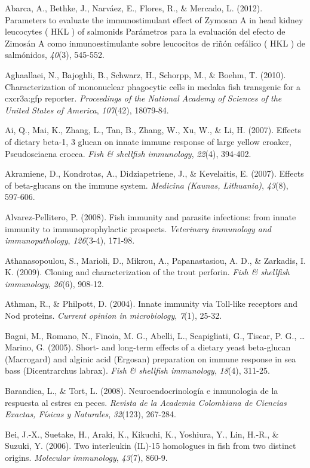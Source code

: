 \documentclass[12pt,letterpaper,oneside]{scrbook}
\begin{document}
Abarca, A., Bethke, J., Narváez, E., Flores, R., \& Mercado, L. (2012).
Parameters to evaluate the immunostimulant effect of Zymosan A in head
kidney leucocytes ( HKL ) of salmonids Parámetros para la evaluación del
efecto de Zimosán A como inmunoestimulante sobre leucocitos de riñón
cefálico ( HKL ) de salmónidos, \emph{40}(3), 545-552.

Aghaallaei, N., Bajoghli, B., Schwarz, H., Schorpp, M., \& Boehm, T.
(2010). Characterization of mononuclear phagocytic cells in medaka fish
transgenic for a cxcr3a:gfp reporter. \emph{Proceedings of the National
Academy of Sciences of the United States of America}, \emph{107}(42),
18079-84.

Ai, Q., Mai, K., Zhang, L., Tan, B., Zhang, W., Xu, W., \& Li, H.
(2007). Effects of dietary beta-1, 3 glucan on innate immune response of
large yellow croaker, Pseudosciaena crocea. \emph{Fish \& shellfish
immunology}, \emph{22}(4), 394-402.

Akramiene, D., Kondrotas, A., Didziapetriene, J., \& Kevelaitis, E.
(2007). Effects of beta-glucans on the immune system. \emph{Medicina
(Kaunas, Lithuania)}, \emph{43}(8), 597-606.

Alvarez-Pellitero, P. (2008). Fish immunity and parasite infections:
from innate immunity to immunoprophylactic prospects. \emph{Veterinary
immunology and immunopathology}, \emph{126}(3-4), 171-98.

Athanasopoulou, S., Marioli, D., Mikrou, A., Papanastasiou, A. D., \&
Zarkadis, I. K. (2009). Cloning and characterization of the trout
perforin. \emph{Fish \& shellfish immunology}, \emph{26}(6), 908-12.

Athman, R., \& Philpott, D. (2004). Innate immunity via Toll-like
receptors and Nod proteins. \emph{Current opinion in microbiology},
\emph{7}(1), 25-32.

Bagni, M., Romano, N., Finoia, M. G., Abelli, L., Scapigliati, G.,
Tiscar, P. G., \ldots{} Marino, G. (2005). Short- and long-term effects
of a dietary yeast beta-glucan (Macrogard) and alginic acid (Ergosan)
preparation on immune response in sea bass (Dicentrarchus labrax).
\emph{Fish \& shellfish immunology}, \emph{18}(4), 311-25.

Barandica, L., \& Tort, L. (2008). Neuroendocrinología e inmunologia de
la respuesta al estres en peces. \emph{Revista de la Academia Colombiana
de Ciencias Exactas, Físicas y Naturales}, \emph{32}(123), 267-284.

Bei, J.-X., Suetake, H., Araki, K., Kikuchi, K., Yoshiura, Y., Lin,
H.-R., \& Suzuki, Y. (2006). Two interleukin (IL)-15 homologues in fish
from two distinct origins. \emph{Molecular immunology}, \emph{43}(7),
860-9.
\end{document}
